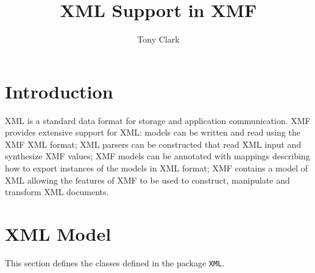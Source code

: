 \documentclass{article}
\title{XML Support in XMF}
\author{Tony Clark}
\begin{document}
\maketitle

\section{Introduction}

XML is a standard data format for storage and application communication. XMF
provides extensive support for XML: models can be written and read using the 
XMF XML format; XML parsers can be constructed that read XML input and
synthesize XMF values; XMF models can be annotated with mappings describing
how to export instances of the models in XML format; XMF contains a model of
XML allowing the features of XMF to be used to construct, manipulate and
transform XML documents.

\section{XML Model}

This section defines the classes defined in the package {\tt XML}.
\end{document}
